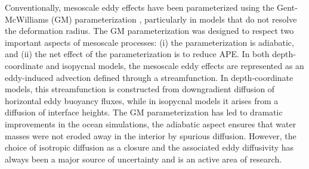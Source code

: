 \documentclass[draft]{agujournal2019}
\begin{document}
Conventionally, mesoscale eddy effects have been parameterized using the Gent-McWilliams (GM) parameterization \cite{gent1990isopycnal}, particularly in models that do not resolve the deformation radius. The GM parameterization was designed to respect two important aspects of mesoscale processes: (i) the parameterization is adiabatic, and (ii) the net effect of the parameterization is to reduce APE. 
In both depth-coordinate and isopycnal models, the mesoscale eddy effects are represented as an eddy-induced advection defined through a streamfunction. In depth-coordinate models, this streamfunction is constructed from downgradient diffusion of horizontal eddy buoyancy fluxes, while in isopycnal models it arises from a diffusion of interface heights.
The GM parameterization has led to dramatic improvements in the ocean simulations, the adiabatic aspect ensures that water masses were not eroded away in the interior by spurious diffusion. However, the choice of isotropic diffusion as a closure and the associated eddy diffusivity has always been a major source of uncertainty and is an active area of research. 


\end{document}
